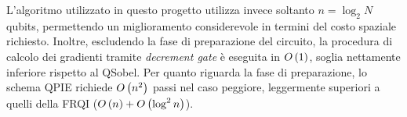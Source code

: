 L'algoritmo utilizzato in questo progetto utilizza invece soltanto $n=\log_2{N}$
qubits, permettendo un miglioramento considerevole in termini del costo spaziale
richiesto. Inoltre, escludendo la fase di preparazione del circuito, la
procedura di calcolo dei gradienti tramite \emph{decrement gate} è eseguita in
$O\left({1}\right)$, soglia nettamente inferiore rispetto al QSobel. Per quanto riguarda
la fase di preparazione, lo schema QPIE richiede $O\left({n^2}\right)$ passi nel caso
peggiore, leggermente superiori a quelli della FRQI ($O\left({n}\right)+O\left({\log^2{n}}\right)$).
